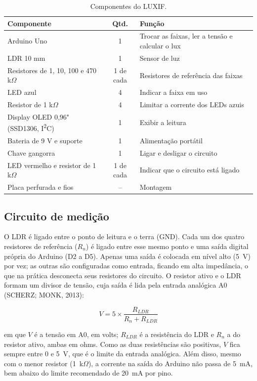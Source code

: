 \documentclass[11pt,a4paper]{article}
\begin{document}
\begin{table}[H]
	\centering
	\caption{Componentes do LUXIF.}
	\label{tab:componentes}
	\small
	\begin{tabular}{lcl}
		\toprule
		Componente & Qtd. & Função \\
		\midrule
		Arduino Uno & 1 & Trocar as faixas, ler a tensão e calcular o lux \\
		LDR 10 mm & 1 & Sensor de luz \\
		Resistores de 1, 10, 100 e 470 k$\Omega$ & 1 de cada & Resistores de referência das faixas \\
		LED azul & 4 & Indicar a faixa em uso \\
		Resistor de 1 k$\Omega$ & 4 & Limitar a corrente dos LEDs azuis \\
		Display OLED 0,96" (SSD1306, I\textsuperscript{2}C) & 1 & Exibir a leitura \\
		Bateria de 9 V e suporte & 1 & Alimentação portátil \\
		Chave gangorra & 1 & Ligar e desligar o circuito \\
		LED vermelho e resistor de 1 k$\Omega$ & 1 de cada & Indicar que o circuito está ligado \\
		Placa perfurada e fios & -- & Montagem \\
		\bottomrule
	\end{tabular}
\end{table}

\subsection*{Circuito de medição}

O LDR é ligado entre o ponto de leitura e o terra (GND). Cada um dos quatro resistores de referência ($R_n$) é ligado entre esse mesmo ponto e uma saída digital própria do Arduino (D2 a D5). Apenas uma saída é colocada em nível alto (5~V) por vez; as outras são configuradas como entrada, ficando em alta impedância, o que na prática desconecta seus resistores do circuito. O resistor ativo e o LDR formam um divisor de tensão, cuja saída é lida pela entrada analógica A0 (SCHERZ; MONK, 2013):

\begin{equation}
	V = 5 \times \frac{R_{LDR}}{R_n + R_{LDR}}
	\label{eq:divisor}
\end{equation}

\noindent em que $V$ é a tensão em A0, em volts; $R_{LDR}$ é a resistência do LDR e $R_n$ a do resistor ativo, ambas em ohms. Como as duas resistências são positivas, $V$ fica sempre entre 0 e 5~V, que é o limite da entrada analógica. Além disso, mesmo com o menor resistor (1~k$\Omega$), a corrente na saída do Arduino não passa de 5~mA, bem abaixo do limite recomendado de 20~mA por pino.
\end{document}
